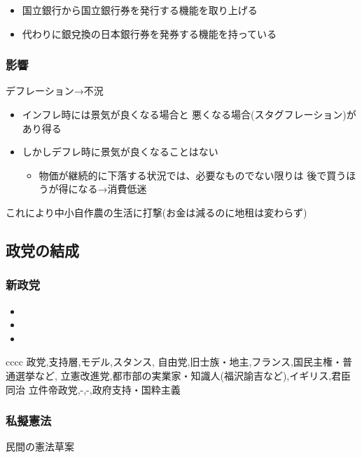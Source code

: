\documentclass[12pt,fleqn]{ltjsarticle}
\begin{document}
\begin{itemize}
\item 国立銀行から国立銀行券を発行する機能を取り上げる
\item 代わりに銀兌換の日本銀行券を発券する機能を持っている
\end{itemize}

\subsubsection{影響}
デフレーション→不況
\begin{itemize}
\item インフレ時には景気が良くなる場合と
悪くなる場合(スタグフレーション)があり得る
\item しかしデフレ時に景気が良くなることはない
\begin{itemize}
\item 物価が継続的に下落する状況では、必要なものでない限りは
後で買うほうが得になる→消費低迷
\end{itemize}
\end{itemize}

これにより中小自作農の生活に打撃(お金は減るのに地租は変わらず)

\subsection{政党の結成}
\subsubsection{新政党}
\begin{itemize}
\item {}
\item {}
\item {}
\end{itemize}


\begin{csvtab}{cccc}
政党,支持層,モデル,スタンス,
自由党,旧士族・地主,フランス,国民主権・普通選挙など,
立憲改進党,都市部の実業家・知識人(福沢諭吉など),イギリス,君臣同治
立件帝政党,-,-,政府支持・国粋主義
\end{csvtab}

\subsubsection{私擬憲法}
民間の憲法草案
\end{document}
